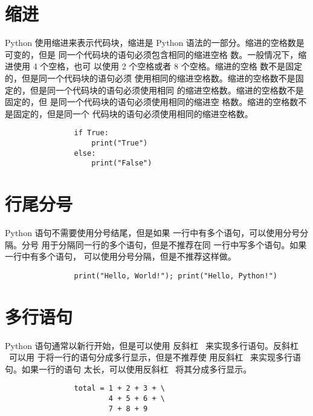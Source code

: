 \documentclass[a4paper,12pt]{article}
\begin{document}
    \section{缩进}
        Python 使用缩进来表示代码块，缩进是 Python
        语法的一部分。缩进的空格数是可变的，但是
        同一个代码块的语句必须包含相同的缩进空格
        数。一般情况下，缩进使用 4 个空格，也可
        以使用 2 个空格或者 8 个空格。缩进的空格
        数不是固定的，但是同一个代码块的语句必须
        使用相同的缩进空格数。缩进的空格数不是固
        定的，但是同一个代码块的语句必须使用相同
        的缩进空格数。缩进的空格数不是固定的，但
        是同一个代码块的语句必须使用相同的缩进空
        格数。缩进的空格数不是固定的，但是同一个
        代码块的语句必须使用相同的缩进空格数。
        \begin{listing}[h]
            \begin{verbatim}
                if True:
                    print("True")
                else:
                    print("False")
            \end{verbatim}
        \end{listing}
    \section{行尾分号}
        Python 语句不需要使用分号结尾，但是如果
        一行中有多个语句，可以使用分号分隔。分号
        用于分隔同一行的多个语句，但是不推荐在同
        一行中写多个语句。如果一行中有多个语句，
        可以使用分号分隔，但是不推荐这样做。
        \begin{listing}[h]
            \begin{verbatim}
                print("Hello, World!"); print("Hello, Python!")
            \end{verbatim}
        \end{listing}
    \section{多行语句}
        Python 语句通常以新行开始，但是可以使用
        反斜杠 \ 来实现多行语句。反斜杠 \ 可以用
        于将一行的语句分成多行显示，但是不推荐使
        用反斜杠 \ 来实现多行语句。如果一行的语句
        太长，可以使用反斜杠 \ 将其分成多行显示。
        \begin{listing}[h]
            \begin{verbatim}
                total = 1 + 2 + 3 + \
                        4 + 5 + 6 + \
                        7 + 8 + 9
            \end{verbatim}
        \end{listing}
\end{document}
